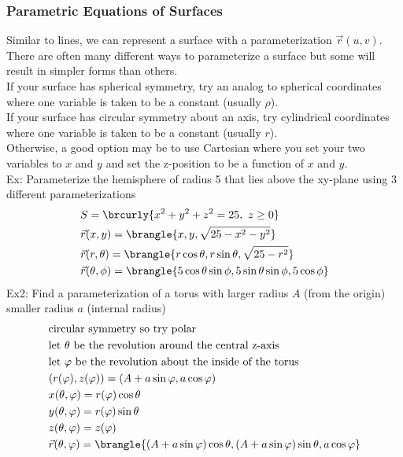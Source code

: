 \subsubsection{Parametric Equations of Surfaces}
Similar to lines, we can represent a surface with a parameterization $\vec{r}(u,v)$.\\
There are often many different ways to parameterize a surface but some will result in simpler forms than others.\\
If your surface has spherical symmetry, try an analog to spherical coordinates where one variable is taken to be a constant (usually $\rho$).\\
If your surface has circular symmetry about an axis, try cylindrical coordinates where one variable is taken to be a constant (usually $r$).\\
Otherwise, a good option may be to use Cartesian where you set your two variables to $x$ and $y$ and set the z-position to be a function of $x$ and $y$.\\
Ex: Parameterize the hemisphere of radius 5 that lies above the xy-plane using 3 different parameterizations
\begin{align*}
    &S=\brcurly{x^2+y^2+z^2=25,\ z\geq0}\\
    &\vec{r}(x,y)=\brangle{x,y,\sqrt{25-x^2-y^2}}\\
    &\vec{r}(r,\theta)=\brangle{r\cos\theta,r\sin\theta,\sqrt{25-r^2}}\\
    &\vec{r}(\theta,\phi)=\brangle{5\cos\theta\sin\phi,5\sin\theta\sin\phi,5\cos\phi}
\end{align*}
Ex2: Find a parameterization of a torus with larger radius $A$ (from the origin) smaller radius $a$ (internal radius)
\begin{align*}
    &\text{circular symmetry so try polar}\\
    &\text{let $\theta$ be the revolution around the central z-axis}\\
    &\text{let $\varphi$ be the revolution about the inside of the torus}\\
    &(r(\varphi),z(\varphi))=(A+a\sin\varphi,a\cos\varphi)\\
    &x(\theta,\varphi)=r(\varphi)\cos\theta\\
    &y(\theta,\varphi)=r(\varphi)\sin\theta\\
    &z(\theta,\varphi)=z(\varphi)\\
    &\vec{r}(\theta,\varphi)=\brangle{(A+a\sin\varphi)\cos\theta,(A+a\sin\varphi)\sin\theta,a\cos\varphi}
\end{align*}